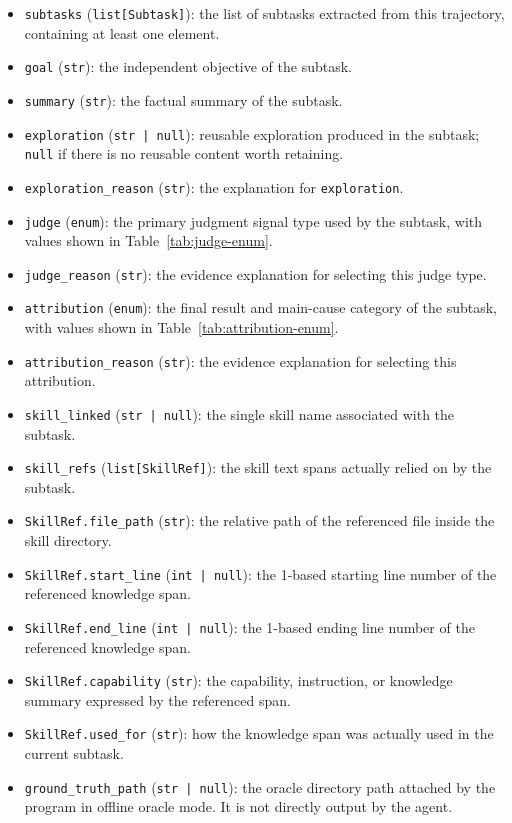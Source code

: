 \documentclass{llmxive}
\begin{document}
\begin{itemize}
    \item \texttt{subtasks} (\texttt{list[Subtask]}): the list of subtasks extracted from this trajectory, containing at least one element.
    \item \texttt{goal} (\texttt{str}): the independent objective of the subtask.
    \item \texttt{summary} (\texttt{str}): the factual summary of the subtask.
    \item \texttt{exploration} (\texttt{str | null}): reusable exploration produced in the subtask; \texttt{null} if there is no reusable content worth retaining.
    \item \texttt{exploration\_reason} (\texttt{str}): the explanation for \texttt{exploration}.
    \item \texttt{judge} (\texttt{enum}): the primary judgment signal type used by the subtask, with values shown in Table~\ref{tab:judge-enum}.
    \item \texttt{judge\_reason} (\texttt{str}): the evidence explanation for selecting this judge type.
    \item \texttt{attribution} (\texttt{enum}): the final result and main-cause category of the subtask, with values shown in Table~\ref{tab:attribution-enum}.
    \item \texttt{attribution\_reason} (\texttt{str}): the evidence explanation for selecting this attribution.
    \item \texttt{skill\_linked} (\texttt{str | null}): the single skill name associated with the subtask.
    \item \texttt{skill\_refs} (\texttt{list[SkillRef]}): the skill text spans actually relied on by the subtask.
    \item \texttt{SkillRef.file\_path} (\texttt{str}): the relative path of the referenced file inside the skill directory.
    \item \texttt{SkillRef.start\_line} (\texttt{int | null}): the 1-based starting line number of the referenced knowledge span.
    \item \texttt{SkillRef.end\_line} (\texttt{int | null}): the 1-based ending line number of the referenced knowledge span.
    \item \texttt{SkillRef.capability} (\texttt{str}): the capability, instruction, or knowledge summary expressed by the referenced span.
    \item \texttt{SkillRef.used\_for} (\texttt{str}): how the knowledge span was actually used in the current subtask.
    \item \texttt{ground\_truth\_path} (\texttt{str | null}): the oracle directory path attached by the program in offline oracle mode. It is not directly output by the agent.
\end{itemize}
\end{document}
